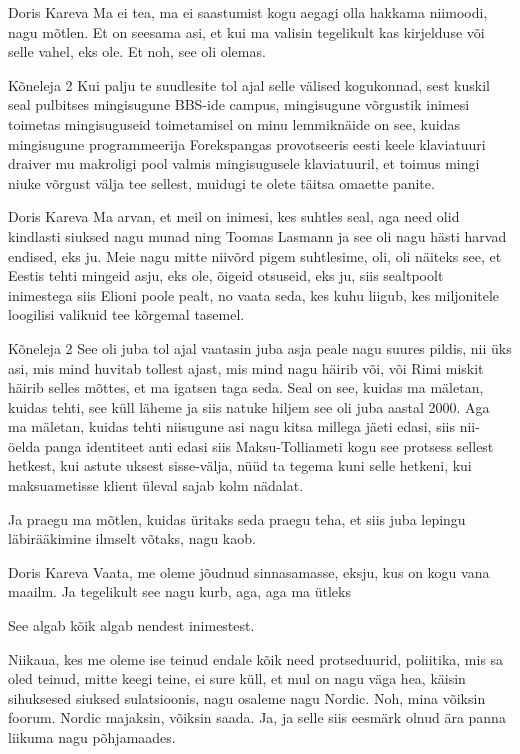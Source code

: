 Doris Kareva
Ma ei tea, ma ei saastumist kogu aegagi olla hakkama niimoodi, nagu mõtlen. Et on seesama asi, et kui ma valisin tegelikult kas kirjelduse või selle vahel, eks ole. Et noh, see oli olemas. 

Kõneleja 2
Kui palju te suudlesite tol ajal selle välised kogukonnad, sest kuskil seal pulbitses mingisugune BBS-ide campus, mingisugune võrgustik inimesi toimetas mingisuguseid toimetamisel on minu lemmiknäide on see, kuidas mingisugune programmeerija Forekspangas provotseeris eesti keele klaviatuuri draiver mu makroligi pool valmis mingisugusele klaviatuuril, et toimus mingi niuke võrgust välja tee sellest, muidugi te olete täitsa omaette panite. 

Doris Kareva
Ma arvan, et meil on inimesi, kes suhtles seal, aga need olid kindlasti siuksed nagu munad ning Toomas Lasmann ja see oli nagu hästi harvad endised, eks ju. Meie nagu mitte niivõrd pigem suhtlesime, oli, oli näiteks see, et Eestis tehti mingeid asju, eks ole, õigeid otsuseid, eks ju, siis sealtpoolt inimestega siis Elioni poole pealt, no vaata seda, kes kuhu liigub, kes miljonitele loogilisi valikuid tee kõrgemal tasemel. 

Kõneleja 2
See oli juba tol ajal vaatasin juba asja peale nagu suures pildis, nii üks asi, mis mind huvitab tollest ajast, mis mind nagu häirib või, või Rimi miskit häirib selles mõttes, et ma igatsen taga seda. Seal on see, kuidas ma mäletan, kuidas tehti, see küll läheme ja siis natuke hiljem see oli juba aastal 2000. Aga ma mäletan, kuidas tehti niisugune asi nagu kitsa millega jäeti edasi, siis nii-öelda panga identiteet anti edasi siis Maksu-Tolliameti kogu see protsess sellest hetkest, kui astute uksest sisse-välja, nüüd ta tegema kuni selle hetkeni, kui maksuametisse klient üleval sajab kolm nädalat. 

Ja praegu ma mõtlen, kuidas üritaks seda praegu teha, et siis juba lepingu läbirääkimine ilmselt võtaks, nagu kaob. 

Doris Kareva
Vaata, me oleme jõudnud sinnasamasse, eksju, kus on kogu vana maailm. Ja tegelikult see nagu kurb, aga, aga ma ütleks 

See algab kõik algab nendest inimestest. 

Niikaua, kes me oleme ise teinud endale kõik need protseduurid, poliitika, mis sa oled teinud, mitte keegi teine, ei sure küll, et mul on nagu väga hea, käisin sihuksesed siuksed sulatsioonis, nagu osaleme nagu Nordic. Noh, mina võiksin foorum. Nordic majaksin, võiksin saada. Ja, ja selle siis eesmärk olnud ära panna liikuma nagu põhjamaades. 

